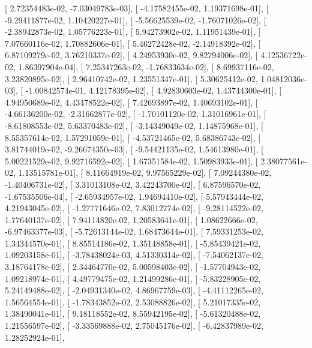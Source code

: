 \documentclass{article}
\begin{document}
       [  2.72354483e-02,  -7.03049783e-03],
       [ -4.17582455e-02,   1.19371698e-01],
       [ -9.29411877e-02,   1.10420227e-01],
       [ -5.56625539e-02,  -1.76071026e-02],
       [ -2.38942873e-02,   1.05776223e-01],
       [  5.94273902e-02,   1.11951439e-01],
       [  7.07660116e-02,   1.70882606e-01],
       [  5.46272428e-02,  -2.14918392e-02],
       [  6.87109279e-02,   3.76210337e-02],
       [  4.24953930e-02,   9.82794006e-02],
       [  4.12536722e-02,   1.86397904e-04],
       [  7.25347263e-02,  -1.76833634e-02],
       [  8.69937116e-02,   3.23820895e-02],
       [  2.96410742e-02,   1.23551347e-01],
       [  5.30625412e-02,   1.04812036e-03],
       [ -1.00842574e-01,   4.12178395e-02],
       [  4.92830603e-02,   1.43744300e-01],
       [  4.94950689e-02,   4.43478522e-02],
       [  7.42693897e-02,   1.40693102e-01],
       [ -4.66136200e-02,  -2.31662877e-02],
       [ -1.70101120e-02,   1.31016961e-01],
       [ -8.61808553e-02,   5.63370483e-02],
       [ -3.14349049e-02,   1.14875968e-01],
       [  8.55357614e-02,   1.57291059e-01],
       [ -4.53721465e-02,   5.68386743e-02],
       [  3.81744019e-02,  -9.26674350e-03],
       [ -9.54421135e-02,   1.54613980e-01],
       [  5.00221529e-02,   9.92716592e-02],
       [  1.67351584e-02,   1.50983933e-01],
       [  2.38077561e-02,   1.13515781e-01],
       [  8.11664919e-02,   9.97565229e-02],
       [  7.09244380e-02,  -1.40406731e-02],
       [  3.31013108e-02,   3.42243700e-02],
       [  6.87596570e-02,  -1.67535506e-04],
       [ -2.65934957e-02,   1.94694410e-02],
       [  5.57943444e-02,   4.21943045e-02],
       [ -1.27771646e-02,   7.83012774e-02],
       [ -9.28114522e-02,   1.77640137e-02],
       [  7.94114820e-02,   1.20583641e-01],
       [  1.08622666e-02,  -6.97463377e-03],
       [ -5.72613144e-02,   1.68473644e-01],
       [  7.59331253e-02,   1.34344570e-01],
       [  8.85514186e-02,   1.35148858e-01],
       [ -5.85439421e-02,   1.09203158e-01],
       [ -3.78438024e-03,   4.51330314e-02],
       [ -7.54062137e-02,   3.18764178e-02],
       [  2.34464770e-02,   5.00598403e-02],
       [ -1.57704943e-02,   1.09218974e-01],
       [  4.49779475e-02,   1.21499286e-01],
       [ -5.83228905e-02,   5.24149488e-02],
       [ -2.04931340e-02,   4.86967759e-03],
       [ -4.41112265e-02,   1.56564554e-01],
       [ -1.78343852e-02,   2.53088826e-02],
       [  5.21017335e-02,   1.38490041e-01],
       [  9.18118552e-02,   8.55942195e-02],
       [ -5.61320488e-02,   1.21556597e-02],
       [ -3.33569888e-02,   2.75045176e-02],
       [ -6.42837989e-02,   1.28252924e-01],
\end{document}
